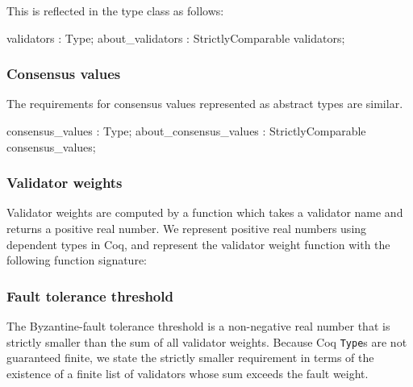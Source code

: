 \documentclass[runningheads]{llncs}
\begin{document}
This is reflected in the type class as follows: 
\begin{coq}
	validators : Type; 
	about_validators : StrictlyComparable validators;
\end{coq}

\subsubsection{Consensus values} 
The requirements for consensus values represented as abstract types are similar. 
\begin{coq}
	consensus_values : Type; 
	about_consensus_values : StrictlyComparable consensus_values; 
\end{coq}

\subsubsection{Validator weights} 
Validator weights are computed by a function which takes a validator name and returns a positive real number. We represent positive real numbers using dependent types in Coq, and represent the validator weight function with the following function signature: 

\subsubsection{Fault tolerance threshold} 
The Byzantine-fault tolerance threshold is a non-negative real number that is strictly smaller than the sum of all validator weights. Because Coq \verb|Type|s are not guaranteed finite, we state the strictly smaller requirement in terms of the existence of a finite list of validators whose sum exceeds the fault weight. 
\end{document}
